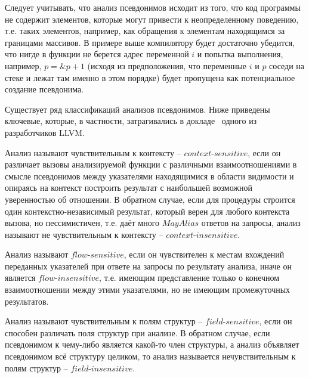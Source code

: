 \begin{myremark}
Следует учитывать, что анализ псевдонимов исходит из того, что код программы не содержит элементов, которые могут привести к неопределенному поведению, т.е. таких элементов, например, как обращения к элементам находящимся за границами массивов. В примере выше компилятору будет достаточно убедится, что нигде в функции не берется адрес переменной $i$ и попытка выполнения, например, $p = \&p + 1$ (исходя из предположения, что переменные $i$ и $p$ соседи на стеке и лежат там именно в этом порядке) будет пропущена как потенциальное создание псевдонима.
\end{myremark}


Существует ряд классификаций анализов псевдонимов. Ниже приведены ключевые, которые, в частности, затрагивались в докладе~\autocite{GohmanAAinLLVM} одного из разработчиков LLVM.

\begin{mydefinition}
Анализ называют чувствительным к контексту -- $context$-$sensitive$, если он различает вызовы анализируемой функции с различными взаимоотношениями в смысле псевдонимов между указателями находящимися в области видимости и опираясь на контекст построить результат с наибольшей возможной уверенностью об отношении. В обратном случае, если для процедуры строится один контекстно-независимый результат, который верен для любого контекста вызова, но пессимистичен, т.е. даёт много $MayAlias$ ответов на запросы, анализ называют не чувствительным к контексту -- $context$-$insensitive$.
\end{mydefinition}

\begin{mydefinition}
Анализ называют $flow$-$sensitive$, если он чувствителен к местам вхождений переданных указателей при ответе на запросы по результату анализа, иначе он является $flow$-$insensitive$, т.е. имеющим представление только о конечном взаимоотношении между этими указателями, но не имеющим промежуточных результатов.
\end{mydefinition}

\begin{mydefinition}
Анализ называют чувствительным к полям структур -- $field$-$sensitive$, если он способен различать поля структур при анализе. В обратном случае, если псевдонимом к чему-либо является какой-то член структуры, а анализ объявляет псевдонимом всё структуру целиком, то анализ называется нечувствительным к полям структур -- $field$-$insensitive$.
\end{mydefinition}

